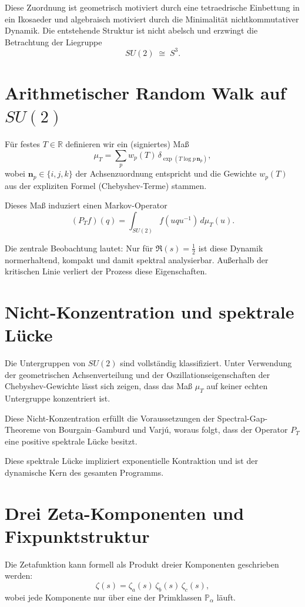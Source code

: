 \documentclass[11pt]{article}
\begin{document}
Diese Zuordnung ist geometrisch motiviert durch eine tetraedrische Einbettung
in ein Ikosaeder und algebraisch motiviert durch die Minimalität nichtkommutativer Dynamik.
Die entstehende Struktur ist nicht abelsch und erzwingt die Betrachtung der Liegruppe
\[
SU(2) \;\cong\; S^3.
\]

\section{Arithmetischer Random Walk auf $SU(2)$}

Für festes $T\in\mathbb{R}$ definieren wir ein (signiertes) Maß
\[
\mu_T = \sum_{p} w_p(T)\,\delta_{\exp(T\log p\,\mathbf{n}_p)},
\]
wobei $\mathbf{n}_p\in\{i,j,k\}$ der Achsenzuordnung entspricht
und die Gewichte $w_p(T)$ aus der expliziten Formel (Chebyshev-Terme) stammen.

Dieses Maß induziert einen Markov-Operator
\[
(P_T f)(q) = \int_{SU(2)} f(uqu^{-1})\,d\mu_T(u).
\]

Die zentrale Beobachtung lautet:
Nur für $\Re(s)=\tfrac12$ ist diese Dynamik normerhaltend,
kompakt und damit spektral analysierbar.
Außerhalb der kritischen Linie verliert der Prozess diese Eigenschaften.

\section{Nicht-Konzentration und spektrale Lücke}

Die Untergruppen von $SU(2)$ sind vollständig klassifiziert.
Unter Verwendung der geometrischen Achsenverteilung
und der Oszillationseigenschaften der Chebyshev-Gewichte
lässt sich zeigen, dass das Maß $\mu_T$ auf keiner echten Untergruppe konzentriert ist.

Diese Nicht-Konzentration erfüllt die Voraussetzungen der
Spectral-Gap-Theoreme von Bourgain--Gamburd und Varjú,
woraus folgt, dass der Operator $P_T$ eine positive spektrale Lücke besitzt.

Diese spektrale Lücke impliziert exponentielle Kontraktion
und ist der dynamische Kern des gesamten Programms.

\section{Drei Zeta-Komponenten und Fixpunktstruktur}

Die Zetafunktion kann formell als Produkt dreier Komponenten geschrieben werden:
\[
\zeta(s) = \zeta_a(s)\,\zeta_b(s)\,\zeta_c(s),
\]
wobei jede Komponente nur über eine der Primklassen $\mathbb{P}_\alpha$ läuft.
\end{document}

